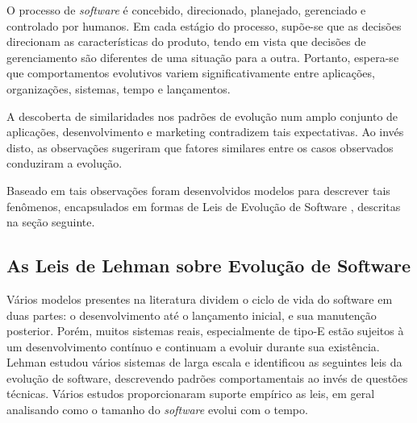 O processo de \textit{software} é concebido, direcionado, planejado, gerenciado e controlado por humanos. Em cada estágio do processo, supõe-se que as decisões direcionam as características do produto, tendo em vista que decisões de gerenciamento são diferentes de uma situação para a outra. Portanto, espera-se que comportamentos evolutivos variem significativamente entre aplicações, organizações, sistemas, tempo e lançamentos.

A descoberta de similaridades nos padrões de evolução num amplo conjunto de aplicações, desenvolvimento e marketing contradizem tais expectativas. Ao invés disto, as observações sugeriram que fatores similares entre os casos observados conduziram a evolução. 
 
Baseado em tais observações foram desenvolvidos modelos para descrever tais fenômenos, encapsulados em formas de Leis de Evolução de Software \cite{lehman1985program}, descritas na seção seguinte.
\subsection{As Leis de Lehman sobre Evolução de Software} \label{sec:lehmalaws}
Vários modelos presentes na literatura dividem o ciclo de vida do software em duas partes: o desenvolvimento até o lançamento inicial, e sua manutenção posterior. Porém, muitos sistemas reais, especialmente de tipo-E estão sujeitos à um desenvolvimento contínuo e continuam a evoluir durante sua existência. 
Lehman estudou vários sistemas de larga escala e identificou as seguintes leis da evolução de software, descrevendo padrões comportamentais ao invés de questões técnicas\cite{lehman1979understanding,lehman1996laws}. Vários estudos proporcionaram suporte empírico as leis, em geral analisando como o tamanho do \textit{software} evolui com o tempo.

